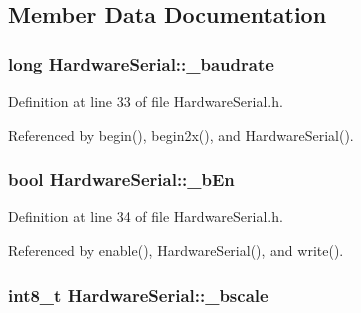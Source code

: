 \subsection{Member Data Documentation}
\hypertarget{class_hardware_serial_ae692ab4a0a8aad73c74a10066fa9da24}{
\subsubsection[{\_\-baudrate}]{\setlength{\rightskip}{0pt plus 5cm}long {\bf HardwareSerial::\_\-baudrate}}}
\label{class_hardware_serial_ae692ab4a0a8aad73c74a10066fa9da24}


Definition at line 33 of file HardwareSerial.h.



Referenced by begin(), begin2x(), and HardwareSerial().

\hypertarget{class_hardware_serial_a8040fbab1f9197a9935df23a4c5e9a3b}{
\subsubsection[{\_\-bEn}]{\setlength{\rightskip}{0pt plus 5cm}bool {\bf HardwareSerial::\_\-bEn}}}
\label{class_hardware_serial_a8040fbab1f9197a9935df23a4c5e9a3b}


Definition at line 34 of file HardwareSerial.h.



Referenced by enable(), HardwareSerial(), and write().

\hypertarget{class_hardware_serial_a37dd406c01fd6432618925f0aeb329f3}{
\subsubsection[{\_\-bscale}]{\setlength{\rightskip}{0pt plus 5cm}int8\_\-t {\bf HardwareSerial::\_\-bscale}}}
\label{class_hardware_serial_a37dd406c01fd6432618925f0aeb329f3}


